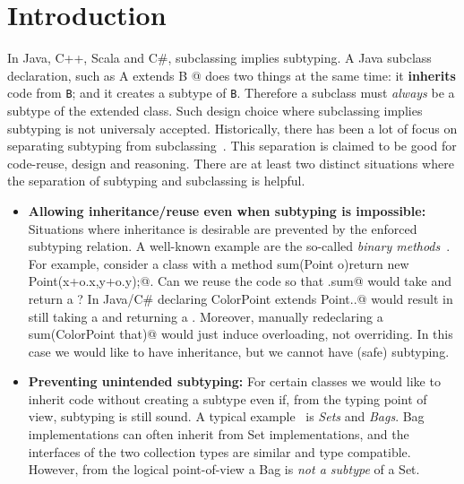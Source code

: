 \saveSpace
\section{Introduction}\label{sec:intro}
\saveSpace
In Java, C++, Scala and C\#, subclassing 
implies subtyping. A Java subclass declaration, such as 
\Q@class A extends B {}@
\noindent does two things at the same time:
it {\bf inherits} code from \lstinline{B}; and it creates
a subtype of \lstinline{B}. Therefore a subclass must \emph{always} be
a subtype of the extended class.
Such design choice where subclassing implies subtyping is not
universaly accepted.
Historically, there has been a lot of focus on
separating subtyping from subclassing~\cite{cook}.  This separation is claimed to be
good for code-reuse, design and reasoning. There are at
least two distinct situations where the separation of subtyping and 
subclassing is helpful.

\begin{itemize}

\item {\bf Allowing inheritance/reuse even when subtyping is impossible:} 
Situations where inheritance is desirable are prevented
by the enforced subtyping relation. A well-known example are the so-called \emph{binary methods}~\cite{cook,bruce96binary}.
For example, consider a class \Q@Point@ with a method 
\Q@Point sum(Point o){return new Point(x+o.x,y+o.y);}@.
Can we reuse the \Q@Point@ code so that \Q@ColorPoint.sum@
would take and return a \Q@ColorPoint@?
In Java/C\# declaring \Q@class ColorPoint extends Point{..}@ would result
in \Q@sum@ still taking a \Q@Point@ and returning a \Q@Point@.
Moreover, manually redeclaring a \Q@ColorPoint sum(ColorPoint that)@
would just induce overloading, not overriding.
In this case we would like to have inheritance, but we cannot
have (safe) subtyping.
%

\item {\bf Preventing unintended subtyping:} For certain classes we
  would like to inherit code without creating a subtype even if, from
  the typing point of view, subtyping is still sound. A typical
  example~\cite{LaLonde:1991:SSS:110673.110679} is \emph{Sets} and
  \emph{Bags}. Bag implementations can often inherit 
  from Set implementations, and the interfaces of the two collection types are
  similar and type compatible. 
  However, from the logical point-of-view a Bag is \emph{not a
    subtype} of a Set. 

\end{itemize}

